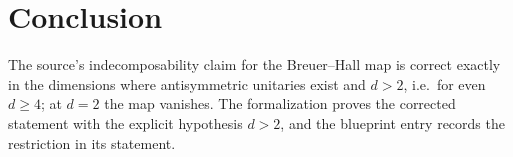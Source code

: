 \documentclass{article}
\begin{document}
\section{Conclusion}

The source's indecomposability claim for the Breuer--Hall map is correct
exactly in the dimensions where antisymmetric unitaries exist and $d>2$,
i.e.\ for even $d\ge4$; at $d=2$ the map vanishes. The formalization proves
the corrected statement with the explicit hypothesis $d>2$, and the
blueprint entry records the restriction in its statement.



\end{document}
